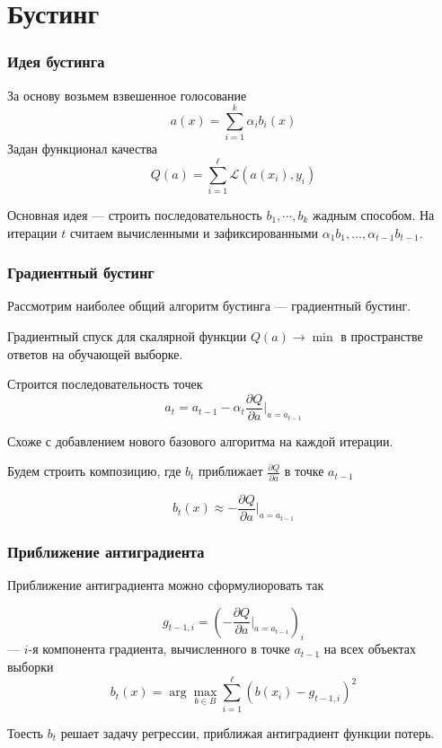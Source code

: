 \documentclass{beamer}
\newcommand{\at}[2][]{#1|_{#2}}
\newcommand{\dd}[2]{\frac{\partial #1}{\partial #2}}
\begin{document}
	\section{Бустинг}

	\begin{frame}
		\frametitle{Идея бустинга}

		За основу возьмем взвешенное голосование
		\[
		a(x) = \sum_{i=1}^{k} \alpha_i b_i(x)
		\]
		Задан функционал качества
		\[
		Q(a) = \sum_{i=1}^{\ell} \mathcal{L} (a(x_i), y_i)
		\] 

		Основная идея --- строить последовательность $b_1, \cdots, b_k$ жадным способом.
		На итерации $t$ считаем вычисленными и зафиксированными $\alpha_1 b_1, \dots, \alpha_{t-1}b_{t-1}$.
	\end{frame}

	\begin{frame}
		\frametitle{Градиентный бустинг}
		Рассмотрим наиболее общий алгоритм бустинга --- градиентный бустинг. 

		\vspace{15pt}

		Градиентный спуск для скалярной функции $Q(a) \rightarrow \min$ в пространстве ответов на обучающей выборке.

		Строится последовательность точек
		\[
		a_t = a_{t-1} - \alpha_t \dd{Q}{a} \at[\Big]{a = a_{t-1}}
		\]

		Схоже с добавлением нового базового алгоритма на каждой итерации.

		\vspace{15pt}
		
		Будем строить композицию, где $b_t$ приближает $\dd{Q}{a}$ в точке $a_{t-1}$

		\[
		b_t(x) \approx - \dd{Q}{a} \at[\Big]{a=a_{t-1}}
		\]
	\end{frame}
	
	\begin{frame}
		\frametitle{Приближение антиградиента}

		Приближение антиградиента можно сформулиоровать так

		\[
		g_{t-1, i} = \left( - \dd{Q}{a}\at[\Big]{a = a_{t-1}} \right)_i
		\]
		--- $i$-я компонента градиента, вычисленного в точке $a_{t-1}$ на всех объектах выборки
		\[
		b_t(x) = \arg \max_{b \in B} \sum_{i=1}^{\ell} \left( b(x_i) - g_{t-1, i} \right)^2
		\]

		Тоесть $b_t$ решает задачу регрессии, приближая антиградиент функции потерь.
	\end{frame}
\end{document}
